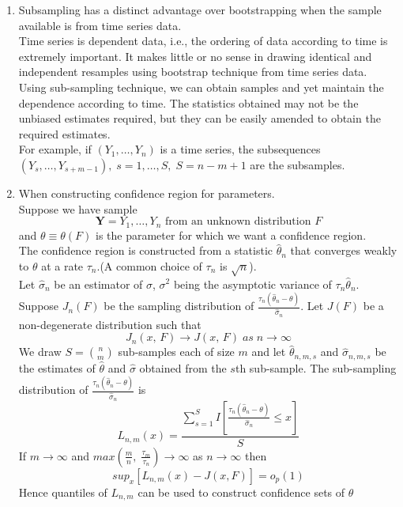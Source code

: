 \documentclass[a4paper, 11pt]{article}
\begin{document}
  \begin{enumerate}
\item Subsampling has a distinct advantage over bootstrapping when the sample available is from time series data.\\
Time series is dependent data, i.e., the ordering of data according to time is extremely important. It makes little or no sense in drawing identical and independent resamples using bootstrap technique from time series data. \\
Using sub-sampling technique, we can obtain samples and yet maintain the dependence according to time. The statistics obtained may not be the unbiased estimates required, but they can be easily amended to obtain the required estimates.\\
For example, if $(Y_1, \ldots, Y_n)$ is a time series, the subsequences $(Y_s, \ldots, Y_{s+m-1}), \; s = 1, \ldots, S,\; S = n-m+1$ are the subsamples.\\
\item When constructing confidence region for parameters.\\
Suppose we have sample $$\mathbf{Y} = Y_1, \ldots, Y_n \mbox{ from an unknown distribution } F$$ and $\theta \equiv \theta(F)$ is the parameter for which we want a confidence region.\\
The confidence region is constructed from a statistic $\hat{\theta}_n$ that converges weakly to $\theta$ at a rate $\tau_n$.(A common choice of $\tau_n$ is $\sqrt{n}$).\\
Let $\hat{\sigma}_n$ be an estimator of $\sigma$, $\sigma^2$ being the asymptotic variance of $\tau_n\hat{\theta}_n$.\\ 
Suppose $J_n(F)$ be the sampling distribution of $\frac{\tau_n(\hat{\theta}_n - \theta)}{\hat{\sigma}_n}$. Let $J(F)$ be  a non-degenerate distribution such that $$J_n(x,\, F) \rightarrow J(x,\, F)\; as \; n \rightarrow \infty$$
We draw $S = {n \choose m}$ sub-samples each of size $m$ and let $\hat{\theta}_{n,m,s}$ and $\hat{\sigma}_{n,m,s}$ be the estimates of $\hat{\theta}$ and $\hat{\sigma}$ obtained from the $s$th sub-sample. The sub-sampling distribution of $\frac{\tau_n(\hat{\theta}_n - \theta)}{\hat{\sigma}_n}$ is $$L_{n,m}(x) = \frac{\sum^S_{s=1}I[\frac{\tau_n(\hat{\theta}_n - \theta)}{\hat{\sigma}_n}\leq x]}{S}$$
If $m \rightarrow \infty$ and $max(\frac{m}{n},\; \frac{\tau_m}{\tau_n}) \rightarrow \infty$ as $n \rightarrow \infty$ then $$sup_x[L_{n,m}(x) - J(x, F)] = o_p(1)$$ Hence quantiles of $L_{n,m}$ can be used to construct confidence sets of $\theta$

\end{enumerate}
\end{document}
